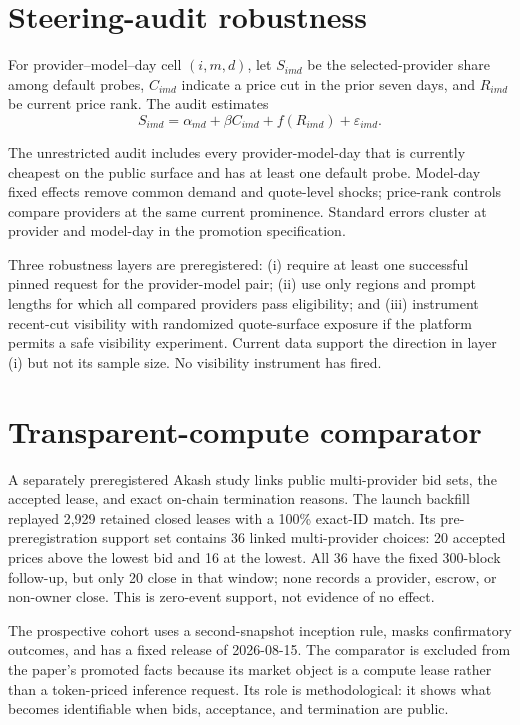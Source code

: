 \documentclass[11pt]{article}
\newcommand{\1}{\mathbf{1}}
\begin{document}
\section{Steering-audit robustness}
\label{app:steering}

For provider--model--day cell $(i,m,d)$, let $S_{imd}$ be the selected-provider
share among default probes, $C_{imd}$ indicate a price cut in the prior seven
days, and $R_{imd}$ be current price rank.  The audit estimates
\begin{equation}
 S_{imd}=\alpha_{md}+\beta C_{imd}+f(R_{imd})+\varepsilon_{imd}.
 \label{eq:steering}
\end{equation}

The unrestricted audit includes every provider-model-day that is currently
cheapest on the public surface and has at least one default probe.  Model-day fixed
effects remove common demand and quote-level shocks; price-rank controls compare
providers at the same current prominence.  Standard errors cluster at provider
and model-day in the promotion specification.

Three robustness layers are preregistered: (i) require at least one successful
pinned request for the provider-model pair; (ii) use only regions and prompt lengths
for which all compared providers pass eligibility; and (iii) instrument recent-cut
visibility with randomized quote-surface exposure if the platform permits a safe
visibility experiment.  Current data support the direction in layer (i) but not its
sample size.  No visibility instrument has fired.

\section{Transparent-compute comparator}
\label{app:akash}

A separately preregistered Akash study links public multi-provider bid sets, the
accepted lease, and exact on-chain termination reasons.  The launch backfill
replayed 2,929 retained closed leases with a 100\% exact-ID match.  Its
pre-preregistration support set contains 36 linked multi-provider choices: 20
accepted prices above the lowest bid and 16 at the lowest.  All 36 have the fixed
300-block follow-up, but only 20 close in that window; none records a provider,
escrow, or non-owner close.  This is zero-event support, not evidence of no effect.

The prospective cohort uses a second-snapshot inception rule, masks confirmatory
outcomes, and has a fixed release of 2026-08-15.  The comparator is excluded from
the paper's promoted facts because its market object is a compute lease rather than a
token-priced inference request.  Its role is methodological: it shows what becomes
identifiable when bids, acceptance, and termination are public.
\end{document}
